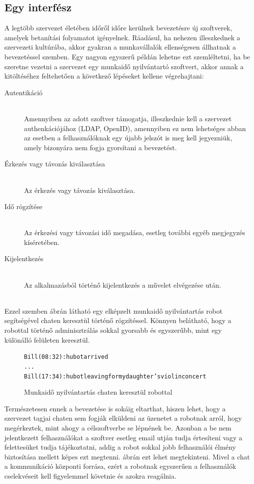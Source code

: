 \subsection*{Egy interfész}
A legtöbb szervezet életében időről időre kerülnek bevezetésre új szoftverek, amelyek betanítási folyamatot igényelnek. Ráadásul, ha nehezen illeszkednek a szervezeti kultúrába, akkor gyakran a munkavállalók ellenségesen állhatnak a bevezetéssel szemben. Egy nagyon egyszerű példán lehetne ezt szemléltetni, ha be szeretne vezetni a szervezet egy munkaidő nyilvántartó szoftvert, akkor annak a kitöltéséhez feltehetően a következő lépéseket kellene végrehajtani:

\begin{description}
  \item[Autentikáció]\hfill\\
  Amennyiben az adott szoftver támogatja, illeszkednie kell a szervezet authenkációjához (LDAP, OpenID), amennyiben ez nem lehetséges abban az esetben a felhasználóknak egy újabb jelszót is meg kell jegyezniük, amely bizonyára nem fogja gyorsítani a bevezetést.
  \item[Érkezés vagy távozás kiválasztása]\hfill\\
  Az érkezés vagy távozás kiválasztása.
  \item[Idő rögzítése]\hfill\\
  Az érkezési vagy távozási idő megadása, esetleg további egyéb megjegyzés kíséretében.
  \item[Kijelentkezés]\hfill\\
  Az alkalmazásból történő kijelentkezés a művelet elvégezése után.
\end{description}
\hfill\\
Ezzel szemben  ábrán látható egy elképzelt munkaidő nyilvántartás robot segítségével chaten keresztül történő rögzítéssel. Könnyen belátható, hogy a robottal történő adminisztrálás sokkal gyorsabb és egyszerűbb, mint egy különálló felületen keresztül.

\begin{figure}[H]
  \begin{alltt}
Bill (08:32): hubot arrived
...
Bill (17:34): hubot leaving for my daughter's violin concert
  \end{alltt}
  \caption[DUMMY]%
    {Munkaidő nyilvántartás chaten keresztül robottal}%
    \label{lst:workhour_with_hubot}
\end{figure}

Természetesen ennek a bevezetése is sokáig eltarthat, hiszen lehet, hogy a szervezet tagjai chaten sem fogják elküldeni az üzenetet a robotnak arról, hogy megérkeztek, mint ahogy a célszoftverbe se lépnének be. Azonban a be nem jelentkezett felhasználókat a szoftver esetleg email utján tudja értesíteni vagy a felettesüket tudja tájékoztatni, addig a robot sokkal jobb felhasználói élmény biztosítása mellett képes ezt megtenni.  ábrán ezt lehet megtekinteni. Mivel a chat a kommunikáció központi forrása, ezért a robotnak egyszerűen a felhasználók cselekvéseit kell figyelemmel követnie és azokra reagálnia.

